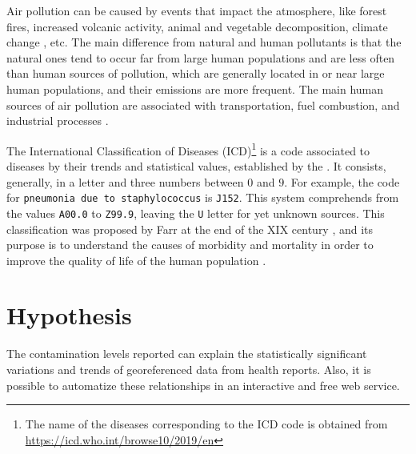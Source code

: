 \documentclass[
  11pt,
  a4paper,
  oneside
]{article}
\begin{document}
Air pollution can be caused by events that impact the atmosphere, like forest fires, increased volcanic activity, animal and vegetable decomposition, climate change \citep{jacobEA2009}, etc. The main difference from natural and human pollutants is that the natural ones tend to occur far from large human populations and are less often than human sources of pollution, which are generally located in or near large human populations, and their emissions are more frequent. The main human sources of air pollution are associated with transportation, fuel combustion, and industrial processes \citep{fenger1999}.

The International Classification of Diseases (ICD)\footnote{The name of the diseases corresponding to the ICD code is obtained from \url{https://icd.who.int/browse10/2019/en}} is a code associated to diseases by their trends and statistical values, established by the \citeauthor{icd} \citep{icd}. It consists, generally, in a letter and three numbers between $0$ and $9$. For example, the code for \texttt{pneumonia due to staphylococcus} is \texttt{J152}. This system comprehends from the values \texttt{A00.0} to \texttt{Z99.9}, leaving the \texttt{U} letter for yet unknown sources. This classification was proposed by Farr at the end of the XIX century \cite{who2011}, and its purpose is to understand the causes of morbidity and mortality in order to improve the quality of life of the human population \cite{who2011}.

\section{Hypothesis}
The contamination levels reported can explain the statistically significant variations and trends of georeferenced data from health reports. Also, it is possible to automatize these relationships in an interactive and free web service.
\end{document}
